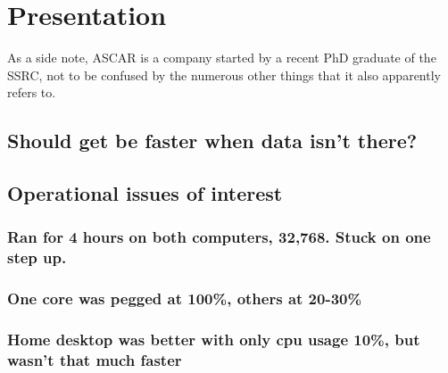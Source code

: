 \documentclass[twocolumn,11pt]{article}
\begin{document}
\section{Presentation}

As a side note, ASCAR is a company started by a recent PhD graduate of the SSRC,
not to be confused by the numerous other things that it also apparently refers
to.

\subsection{Should get be faster when data isn't there?}


\subsection{Operational issues of interest}

\subsubsection{Ran for 4 hours on both computers, 32,768. Stuck on one step up.}

\subsubsection{One core was pegged at 100\%, others at 20-30\%}

\subsubsection{Home desktop was better with only cpu usage 10\%, but wasn’t that
much faster}

\end{document}
